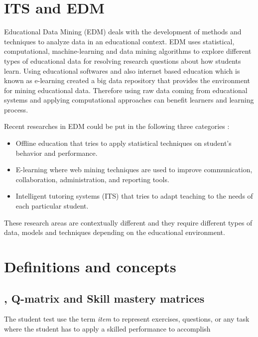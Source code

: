 \label{sec:RevLitt}

\section{ITS and EDM}
Educational Data Mining (EDM) deals with the development of methods and techniques to analyze data in an educational context. EDM uses statistical, computational, machine-learning and data mining algorithms to explore different types of educational data for resolving research questions about how students learn. Using educational softwares and also internet based education which is known as e-learning created a big data repository that provides the environment for mining educational data. Therefore using raw data coming  from educational systems and applying computational approaches can benefit learners and learning process.

Recent researches in EDM could be put in the following three categories \citep{romero2010educational} :
\begin{itemize}
\item Offline education that tries to apply statistical techniques on student's behavior and performance.
\item E-learning where web mining techniques are used to improve communication, collaboration, administration, and reporting tools.
\item Intelligent tutoring systems (ITS) that tries to adapt teaching to the needs of each particular student.
\end{itemize}

These research areas are contextually different and they require different types of data, models and techniques depending on the educational environment.

\section{Definitions and concepts}

 
\subsection{\DIFdelbegin {}\DIFdelend \DIFaddbegin {}\DIFaddend , Q-matrix and Skill mastery matrices}

The student test \DIFdelbegin {}\DIFdelend \DIFaddbegin {}\DIFaddend use the term \textit{item} to represent exercises, questions, or any task where the student has to apply a skilled performance to accomplish \DIFdelbegin {}%


